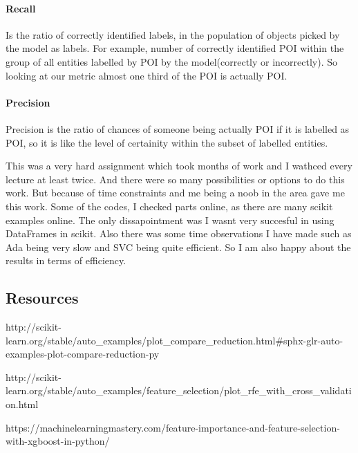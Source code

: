 \documentclass[11pt]{article}
\begin{document}
\paragraph{Recall}\label{recall}

Is the ratio of correctly identified labels, in the population of
objects picked by the model as labels. For example, number of correctly
identified POI within the group of all entities labelled by POI by the
model(correctly or incorrectly). So looking at our metric almost one
third of the POI is actually POI.

\paragraph{Precision}\label{precision}

Precision is the ratio of chances of someone being actually POI if it is
labelled as POI, so it is like the level of certainity within the subset
of labelled entities.

This was a very hard assignment which took months of work and I wathced
every lecture at least twice. And there were so many possibilities or
options to do this work. But because of time constraints and me being a
noob in the area gave me this work. Some of the codes, I checked parts
online, as there are many scikit examples online. The only
dissapointment was I wasnt very succesful in using DataFrames in scikit.
Also there was some time observations I have made such as Ada being very
slow and SVC being quite efficient. So I am also happy about the results
in terms of efficiency.

    \subsection{Resources}\label{resources}

http://scikit-learn.org/stable/auto\_examples/plot\_compare\_reduction.html\#sphx-glr-auto-examples-plot-compare-reduction-py

http://scikit-learn.org/stable/auto\_examples/feature\_selection/plot\_rfe\_with\_cross\_validation.html

https://machinelearningmastery.com/feature-importance-and-feature-selection-with-xgboost-in-python/


    
    
    
    
\end{document}

